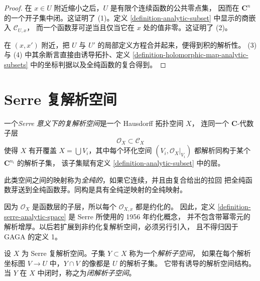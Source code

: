 \begin{proof}
在 $x\in U$ 附近缩小之后，$U$ 是有限个连续函数的公共零点集，
因而在 $\mathbf C^n$ 的一个开子集中闭。这证明了 (1)。定义
\ref{definition-analytic-subset} 中显示的商嵌入 $\mathcal C_{U,x}$，
而一个函数芽可逆当且仅当它在 $x$ 处的值非零。这证明了 (2)。

在 $(x,x')$ 附近，把 $U$ 与 $U'$ 的局部定义方程合并起来，便得到积的解析性。
(3) 与 (4) 中其余断言直接由诱导拓扑、定义
\ref{definition-holomorphic-map-analytic-subsets} 中的坐标判据以及全纯函数的复合得到。
\end{proof}


\section{Serre 复解析空间}
\label{section-serre-analytic-spaces}

\begin{definition}
\label{definition-serre-analytic-space}
\begin{reference}
\cite[\S 1，第 2 号，第 4--5 页]{GAGA}
\end{reference}
一个{\it Serre 意义下的复解析空间}是一个 Hausdorff 拓扑空间 $X$，
连同一个 $\mathbf C$-代数子层
$$
\mathcal O_X \subset \mathcal C_X
$$
使得 $X$ 有开覆盖 $X=\bigcup V_i$，其中每个环化空间
$(V_i,\mathcal O_X|_{V_i})$ 都解析同构于某个 $\mathbf C^{n_i}$ 的解析子集，
该子集赋有定义 \ref{definition-analytic-subset} 中的层。

此类空间之间的映射称为{\it 全纯的}，如果它连续，并且由复合给出的拉回
把全纯函数芽送到全纯函数芽。同构是具有全纯逆映射的全纯映射。
\end{definition}

\begin{remark}[约化范围]
\label{remark-serre-analytic-spaces-reduced}
因为 $\mathcal O_X$ 是函数层的子层，所以每个 $\mathcal O_{X,x}$ 都是约化的。
因此，定义 \ref{definition-serre-analytic-space} 是 Serre 所使用的 1956 年约化概念，
并不包含带幂零元的解析增厚。以后若扩展到非约化复解析空间，必须另行引入，
且不得归因于 GAGA 的定义 1。
\end{remark}

\begin{definition}
\label{definition-analytic-subspace}
设 $X$ 为 Serre 复解析空间。子集 $Y\subset X$ 称为一个{\it 解析子空间}，
如果在每个解析坐标图 $V\to U$ 中，$Y\cap V$ 的像都是 $U$ 的解析子集。
它带有诱导的解析空间结构。当 $Y$ 在 $X$ 中闭时，称之为{\it 闭解析子空间}。
\end{definition}

